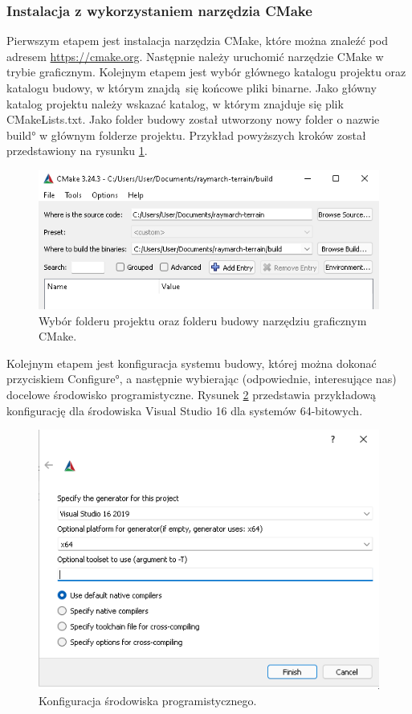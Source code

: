 \subsubsection{Instalacja z wykorzystaniem narzędzia CMake}
Pierwszym etapem jest instalacja narzędzia CMake, które można znaleźć pod adresem \url{https://cmake.org}.
Następnie należy uruchomić narzędzie CMake w trybie graficznym.
Kolejnym etapem jest wybór głównego katalogu projektu oraz katalogu budowy, w którym znajdą się końcowe pliki binarne.
Jako główny katalog projektu należy wskazać katalog, w którym znajduje się plik CMakeLists.txt.
Jako folder budowy został utworzony nowy folder o nazwie \ang{build} w głównym folderze projektu.
Przykład powyższych kroków został przedstawiony na rysunku \ref{fig:cmake-win}.
\begin{figure}[H]
\centering
\includegraphics[width=1\textwidth]{./graf/cmake-win.png}
\caption{Wybór folderu projektu oraz folderu budowy narzędziu graficznym CMake.}
\label{fig:cmake-win}
\end{figure}
Kolejnym etapem jest konfiguracja systemu budowy, której można dokonać przyciskiem \ang{Configure}, a następnie wybierając (odpowiednie, interesujące nas) docelowe środowisko programistyczne. Rysunek \ref{fig:cmake-conf} przedstawia przykładową konfigurację dla środowiska Visual Studio 16 dla systemów 64-bitowych.

\begin{figure}[H]
\centering
\includegraphics[width=1\textwidth]{./graf/cmake-conf.png}
\caption{Konfiguracja środowiska programistycznego.}
\label{fig:cmake-conf}
\end{figure}

